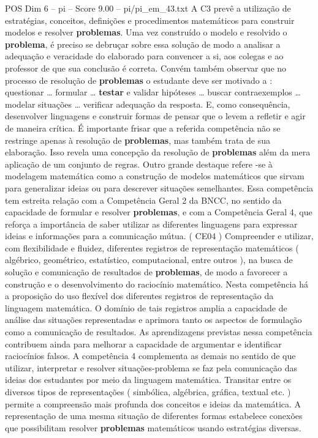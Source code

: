 \begin{textsample}{POS Dim 6 – pi – Score 9.00 – pi/pi\_em\_43.txt}
A C3 prevê a utilização de estratégias, conceitos, definições e procedimentos matemáticos para construir modelos e resolver \textbf{problemas}.
Uma vez construído o modelo e resolvido o \textbf{problema}, é preciso se debruçar sobre essa solução de modo a analisar a adequação e veracidade do elaborado para convencer a si, aos colegas e ao professor de que sua conclusão é correta.
Convém também observar que no processo de resolução de \textbf{problemas} o estudante deve ser motivado a : questionar … formular … \textbf{testar} e validar hipóteses … buscar contraexemplos … modelar situações … verificar adequação da resposta.
E, como consequência, desenvolver linguagens e construir formas de pensar que o levem a refletir e agir de maneira crítica.
É importante frisar que a referida competência não se restringe apenas à resolução de \textbf{problemas}, mas também trata de sua elaboração.
Isso revela uma concepção da resolução de \textbf{problemas} além da mera aplicação de um conjunto de regras.
Outro grande destaque refere -se à modelagem matemática como a construção de modelos matemáticos que sirvam para generalizar ideias ou para descrever situações semelhantes.
Essa competência tem estreita relação com a Competência Geral 2 da BNCC, no sentido da capacidade de formular e resolver \textbf{problemas}, e com a Competência Geral 4, que reforça a importância de saber utilizar as diferentes linguagens para expressar ideias e informações para a comunicação mútua. ( CE04 ) Compreender e utilizar, com flexibilidade e fluidez, diferentes registros de representação matemáticos ( algébrico, geométrico, estatístico, computacional, entre outros ), na busca de solução e comunicação de resultados de \textbf{problemas}, de modo a favorecer a construção e o desenvolvimento do raciocínio matemático.
Nesta competência há a proposição do uso flexível dos diferentes registros de representação da linguagem matemática.
O domínio de tais registros amplia a capacidade de análise das situações representadas e aprimora tanto os aspectos de formulação como a comunicação de resultados.
As aprendizagens previstas nessa competência contribuem ainda para melhorar a capacidade de argumentar e identificar raciocínios falsos.
A competência 4 complementa as demais no sentido de que utilizar, interpretar e resolver situações-problema se faz pela comunicação das ideias dos estudantes por meio da linguagem matemática.
Transitar entre os diversos tipos de representações ( simbólica, algébrica, gráfica, textual etc. ) permite a compreensão mais profunda dos conceitos e ideias da matemática.
A representação de uma mesma situação de diferentes formas estabelece conexões que possibilitam resolver \textbf{problemas} matemáticos usando estratégias diversas.

\end{textsample}
